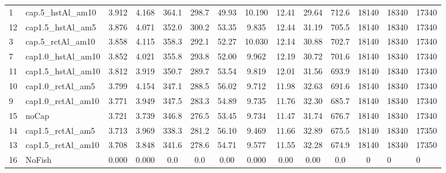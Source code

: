 \documentclass[11pt]{book}
\begin{document}
\begin{turn}
\begin{longtable}[t]{llccccccccccll}
1 & cap.5\_hstAl\_am10 & 3.912 & 4.168 & 364.1 & 298.7 & 49.93 & 10.190 & 12.41 & 29.64 & 712.6 & 18140 & 18340 & 17340\\
12 & cap1.5\_hstAl\_am5 & 3.876 & 4.071 & 352.0 & 300.2 & 53.35 & 9.835 & 12.44 & 31.19 & 705.5 & 18140 & 18340 & 17340\\
3 & cap.5\_rctAl\_am10 & 3.858 & 4.115 & 358.3 & 292.1 & 52.27 & 10.030 & 12.14 & 30.88 & 702.7 & 18140 & 18340 & 17340\\
7 & cap1.0\_hstAl\_am10 & 3.852 & 4.021 & 355.8 & 293.8 & 52.00 & 9.962 & 12.19 & 30.72 & 701.6 & 18140 & 18340 & 17340\\
11 & cap1.5\_hstAl\_am10 & 3.812 & 3.919 & 350.7 & 289.7 & 53.54 & 9.819 & 12.01 & 31.56 & 693.9 & 18140 & 18340 & 17340\\
10 & cap1.0\_rctAl\_am5 & 3.799 & 4.154 & 347.1 & 288.5 & 56.02 & 9.712 & 11.98 & 32.63 & 691.6 & 18140 & 18340 & 17340\\
9 & cap1.0\_rctAl\_am10 & 3.771 & 3.949 & 347.5 & 283.3 & 54.89 & 9.735 & 11.76 & 32.30 & 685.7 & 18140 & 18340 & 17340\\
15 & noCap & 3.721 & 3.739 & 346.8 & 276.5 & 53.45 & 9.734 & 11.47 & 31.74 & 676.7 & 18140 & 18340 & 17340\\
14 & cap1.5\_rctAl\_am5 & 3.713 & 3.969 & 338.3 & 281.2 & 56.10 & 9.469 & 11.66 & 32.89 & 675.5 & 18140 & 18340 & 17350\\
13 & cap1.5\_rctAl\_am10 & 3.708 & 3.848 & 341.6 & 278.6 & 54.71 & 9.577 & 11.55 & 32.28 & 674.9 & 18140 & 18340 & 17350\\
16 & NoFish & 0.000 & 0.000 & 0.0 & 0.0 & 0.00 & 0.000 & 0.00 & 0.00 & 0.0 & 0 & 0 & 0\\
\bottomrule
\end{longtable}
\endgroup{}
\endgroup{}

\newpage


\end{turn}
\end{document}
